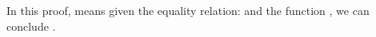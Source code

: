 \documentclass{l4proj}
\begin{document}
In this proof, \AgdaSpace{}%
\AgdaSymbol{((}\AgdaSpace{}%
\AgdaSpace{}%
\AgdaSymbol{)}\AgdaSpace{}%
\AgdaSpace{}%
\AgdaSpace{}%
\AgdaSymbol{)}\AgdaSpace{}%
\AgdaSymbol{(}\AgdaSpace{}%
\AgdaSpace{}%
\AgdaSpace{}%
\AgdaSymbol{)} means given the equality relation: \AgdaSymbol{(}\AgdaSpace{}%
\AgdaSpace{}%
\AgdaSpace{}%
\AgdaSymbol{)} and the function \AgdaSymbol{(}\AgdaSpace{}%
\AgdaSpace{}%
\AgdaSymbol{)}\AgdaSpace{}%
\AgdaSpace{}%
\AgdaSpace{}%
\AgdaSymbol{)}, we can conclude
\AgdaSymbol{(}\AgdaSpace{}%
\AgdaSpace{}%
\AgdaSymbol{)}\AgdaSpace{}%
\AgdaSpace{}%
\AgdaSpace{}%
\AgdaSpace{}%
\AgdaSpace{}%
\AgdaSymbol{(}\AgdaSpace{}%
\AgdaSpace{}%
\AgdaSymbol{)}\AgdaSpace{}%
\AgdaSpace{}%
\AgdaSymbol{(}\AgdaSpace{}%
\AgdaSpace{}%
\AgdaSymbol{)}\AgdaSpace{}%
\AgdaSpace{}%
\AgdaSpace{}%
\AgdaSpace{}%
\AgdaSymbol{(}\AgdaSpace{}%
\AgdaSpace{}%
\AgdaSymbol{)}\AgdaSpace{}%
.
\end{document}
